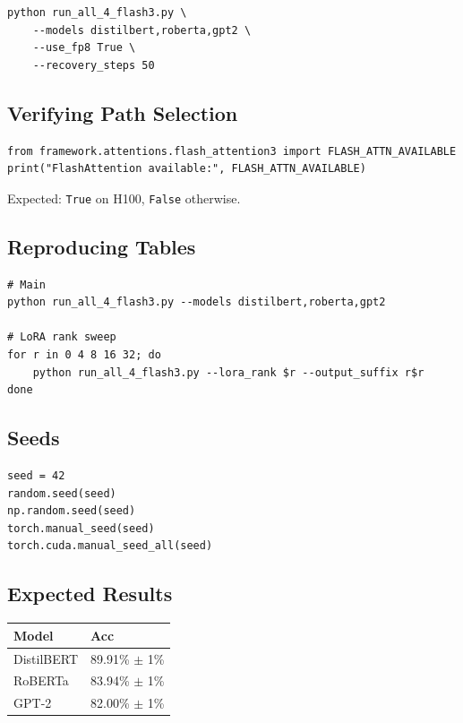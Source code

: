\begin{lstlisting}
python run_all_4_flash3.py \
    --models distilbert,roberta,gpt2 \
    --use_fp8 True \
    --recovery_steps 50
\end{lstlisting}

\subsection{Verifying Path Selection}

\begin{lstlisting}
from framework.attentions.flash_attention3 import FLASH_ATTN_AVAILABLE
print("FlashAttention available:", FLASH_ATTN_AVAILABLE)
\end{lstlisting}

Expected: \texttt{True} on H100, \texttt{False} otherwise.

\subsection{Reproducing Tables}

\begin{lstlisting}
# Main
python run_all_4_flash3.py --models distilbert,roberta,gpt2

# LoRA rank sweep
for r in 0 4 8 16 32; do
    python run_all_4_flash3.py --lora_rank $r --output_suffix r$r
done
\end{lstlisting}

\subsection{Seeds}

\begin{lstlisting}
seed = 42
random.seed(seed)
np.random.seed(seed)
torch.manual_seed(seed)
torch.cuda.manual_seed_all(seed)
\end{lstlisting}

\subsection{Expected Results}

\begin{table}[H]
\centering
\small
\begin{tabular}{ll}
\toprule
\textbf{Model} & \textbf{Acc} \\
\midrule
DistilBERT & 89.91\% $\pm$ 1\% \\
RoBERTa & 83.94\% $\pm$ 1\% \\
GPT-2 & 82.00\% $\pm$ 1\% \\
\bottomrule
\end{tabular}
\end{table}

